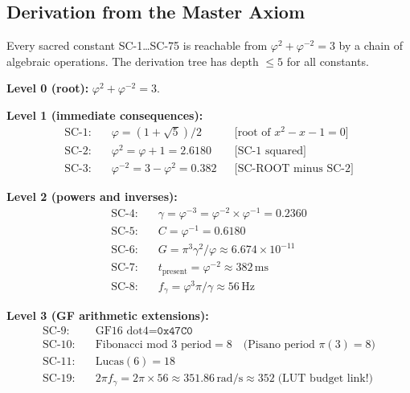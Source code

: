 \subsection{Derivation from the Master Axiom}

Every sacred constant SC-1\ldots SC-75 is reachable from
\(\varphi^2 + \varphi^{-2} = 3\) by a chain of algebraic operations.
The derivation tree has depth \(\le 5\) for all constants.

\textbf{Level 0 (root):} \(\varphi^2 + \varphi^{-2} = 3\).

\textbf{Level 1 (immediate consequences):}
\begin{align*}
  \text{SC-1:} &\quad \varphi = (1+\sqrt{5})/2
                          &&\text{[root of }x^2-x-1=0\text{]}\\
  \text{SC-2:} &\quad \varphi^2 = \varphi + 1 = 2.6180
                          &&\text{[SC-1 squared]}\\
  \text{SC-3:} &\quad \varphi^{-2} = 3 - \varphi^2 = 0.382
                          &&\text{[SC-ROOT minus SC-2]}
\end{align*}

\textbf{Level 2 (powers and inverses):}
\begin{align*}
  \text{SC-4:} &\quad \gamma = \varphi^{-3} = \varphi^{-2} \times \varphi^{-1}
                               = 0.2360\\
  \text{SC-5:} &\quad C = \varphi^{-1} = 0.6180\\
  \text{SC-6:} &\quad G = \pi^3\gamma^2/\varphi \approx 6.674\times10^{-11}\\
  \text{SC-7:} &\quad t_{\text{present}} = \varphi^{-2} \approx 382\,\text{ms}\\
  \text{SC-8:} &\quad f_\gamma = \varphi^3\pi/\gamma \approx 56\,\text{Hz}
\end{align*}

\textbf{Level 3 (GF arithmetic extensions):}
\begin{align*}
  \text{SC-9:}  &\quad \text{GF16 dot4} = \texttt{0x47C0}\\
  \text{SC-10:} &\quad \text{Fibonacci mod~3 period} = 8
                         \quad\text{(Pisano period }\pi(3) = 8\text{)}\\
  \text{SC-11:} &\quad \text{Lucas}(6) = 18\\
  \text{SC-19:} &\quad 2\pi f_\gamma = 2\pi \times 56 \approx 351.86\,\text{rad/s}
                        \approx 352\;\text{(LUT budget link!)}
\end{align*}

